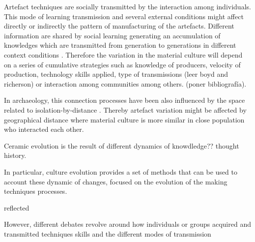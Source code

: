 \documentclass[review]{elsarticle}
\begin{document}
Artefact techniques are socially transmitted by the interaction among individuals.
This mode of learning transmission and several external conditions might affect directly or indirectly the pattern of manufacturing of the artefacts. Different information are shared by social learning generating an accumulation of knowledges which are transmitted from generation to generations in different context conditions  \citep{neff1992ceramics,henrich_evolution_2003, boyd_cultural_2011}. Therefore the variation in the material culture will depend on a series of cumulative strategies such as knowledge of producers, velocity of production, technology skills applied, type of transmissions (leer boyd and richerson) or interaction among communities among others. (poner bibliografía). 











In archaeology, this connection processes have been also influenced by the space related to isolation-by-distance \citep{bjorklund_effect_2010} . Thereby artefact variation might be affected by geographical distance where material culture is more similar in close population who interacted each other. 

Ceramic evolution is the result of different dynamics of knowdledge?? thought history. 
   


In particular, culture evolution provides a set of methods that can be used to account these dynamic of changes, focused on the evolution of the making techniques processes. 








reflected                                 


However, different debates revolve around how individuals or groups acquired and transmitted techniques skills and the different modes of transmission   \citep{roux_standardization_2015} 
\end{document}
